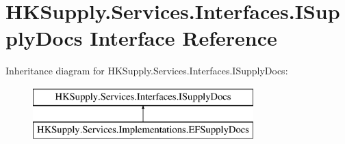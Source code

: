 \hypertarget{interface_h_k_supply_1_1_services_1_1_interfaces_1_1_i_supply_docs}{}\section{H\+K\+Supply.\+Services.\+Interfaces.\+I\+Supply\+Docs Interface Reference}
\label{interface_h_k_supply_1_1_services_1_1_interfaces_1_1_i_supply_docs}
Inheritance diagram for H\+K\+Supply.\+Services.\+Interfaces.\+I\+Supply\+Docs\+:\begin{figure}[H]
\begin{center}
\leavevmode
\includegraphics[height=2.000000cm]{interface_h_k_supply_1_1_services_1_1_interfaces_1_1_i_supply_docs}
\end{center}
\end{figure}

